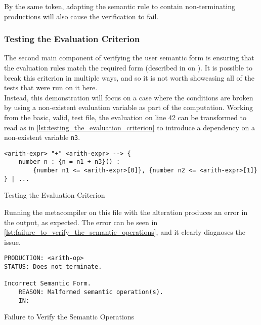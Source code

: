 By the same token, adapting the semantic rule to contain non-terminating productions will also cause the verification to fail.


\subsubsection{Testing the Evaluation Criterion} %
\label{ssub:testing_the_evaluation_criterion}
The second main component of verifying the user semantic form is ensuring that the evaluation rules match the required form (described in  on ).
It is possible to break this criterion in multiple ways, and so it is not worth showcasing all of the tests that were run on it here.\\

Instead, this demonstration will focus on a case where the conditions are broken by using a non-existent evaluation variable as part of the computation.
Working from the basic, valid, test file, the evaluation on line 42 can be transformed to read as in \autoref{lst:testing_the_evaluation_criterion} to introduce a dependency on a non-existent variable \texttt{n3}.

\begin{listing}[!htb]
\begin{verbatim}
<arith-expr> "+" <arith-expr> --> {
    number n : {n = n1 + n3}() :
        {number n1 <= <arith-expr>[0]}, {number n2 <= <arith-expr>[1]}
} | ...
\end{verbatim}
\caption{Testing the Evaluation Criterion}
\label{lst:testing_the_evaluation_criterion}
\end{listing}

Running the metacompiler on this file with the alteration produces an error in the output, as expected. 
The error can be seen in \autoref{lst:failure_to_verify_the_semantic_operations}, and it clearly diagnoses the issue. 

\begin{listing}[!htb]
\begin{verbatim}
PRODUCTION: <arith-op>
STATUS: Does not terminate.

Incorrect Semantic Form.
    REASON: Malformed semantic operation(s).
    IN:
\end{verbatim}
\caption{Failure to Verify the Semantic Operations}
\label{lst:failure_to_verify_the_semantic_operations}
\end{listing}


